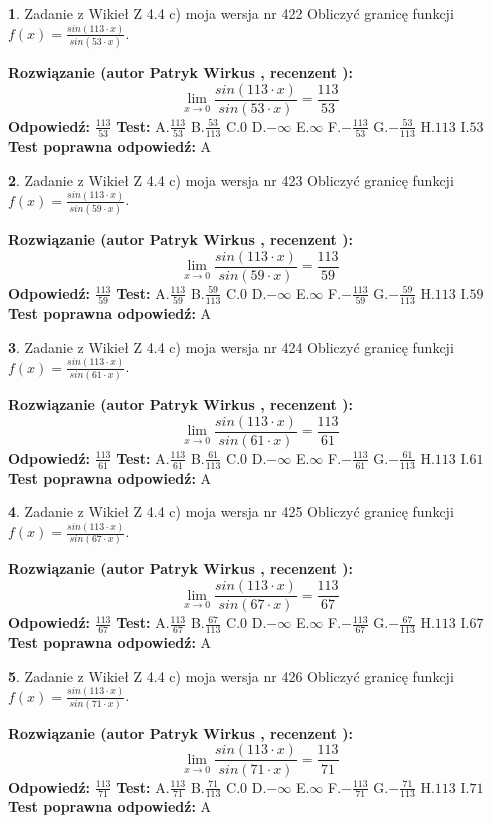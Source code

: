 \documentclass[12pt, a4paper]{article}
\theoremstyle{definition} %
\newtheorem{zad}{}
\newcommand{\zadStart}[1]{\begin{zad}#1\newline}
\newcommand{\zadStop}{\end{zad}}
\newcommand{\rozwStart}[2]{\noindent \textbf{Rozwiązanie (autor #1 , recenzent #2): }\newline}
\newcommand{\rozwStop}{\newline}
\newcommand{\odpStart}{\noindent \textbf{Odpowiedź:}\newline}
\newcommand{\odpStop}{\newline}
\newcommand{\testStart}{\noindent \textbf{Test:}\newline}
\newcommand{\testStop}{\newline}
\newcommand{\kluczStart}{\noindent \textbf{Test poprawna odpowiedź:}\newline}
\newcommand{\kluczStop}{\newline}
\begin{document}
\zadStart{Zadanie z Wikieł Z 4.4 c) moja wersja nr 422}
Obliczyć granicę funkcji $f(x)=\frac{sin(113\cdot x)}{sin(53\cdot x)}$.
\zadStop
\rozwStart{Patryk Wirkus}{}
$$\lim\limits_{x\to 0}\frac{sin(113\cdot x)}{sin(53\cdot x)}=
\frac{113}{53}$$
\rozwStop
\odpStart
$\frac{113}{53}$
\odpStop
\testStart
A.$\frac{113}{53}$
B.$\frac{53}{113}$
C.$0$
D.$-\infty$
E.$\infty$
F.$-\frac{113}{53}$
G.$-\frac{53}{113}$
H.$113$
I.$53$
\testStop
\kluczStart
A
\kluczStop



\zadStart{Zadanie z Wikieł Z 4.4 c) moja wersja nr 423}
Obliczyć granicę funkcji $f(x)=\frac{sin(113\cdot x)}{sin(59\cdot x)}$.
\zadStop
\rozwStart{Patryk Wirkus}{}
$$\lim\limits_{x\to 0}\frac{sin(113\cdot x)}{sin(59\cdot x)}=
\frac{113}{59}$$
\rozwStop
\odpStart
$\frac{113}{59}$
\odpStop
\testStart
A.$\frac{113}{59}$
B.$\frac{59}{113}$
C.$0$
D.$-\infty$
E.$\infty$
F.$-\frac{113}{59}$
G.$-\frac{59}{113}$
H.$113$
I.$59$
\testStop
\kluczStart
A
\kluczStop



\zadStart{Zadanie z Wikieł Z 4.4 c) moja wersja nr 424}
Obliczyć granicę funkcji $f(x)=\frac{sin(113\cdot x)}{sin(61\cdot x)}$.
\zadStop
\rozwStart{Patryk Wirkus}{}
$$\lim\limits_{x\to 0}\frac{sin(113\cdot x)}{sin(61\cdot x)}=
\frac{113}{61}$$
\rozwStop
\odpStart
$\frac{113}{61}$
\odpStop
\testStart
A.$\frac{113}{61}$
B.$\frac{61}{113}$
C.$0$
D.$-\infty$
E.$\infty$
F.$-\frac{113}{61}$
G.$-\frac{61}{113}$
H.$113$
I.$61$
\testStop
\kluczStart
A
\kluczStop



\zadStart{Zadanie z Wikieł Z 4.4 c) moja wersja nr 425}
Obliczyć granicę funkcji $f(x)=\frac{sin(113\cdot x)}{sin(67\cdot x)}$.
\zadStop
\rozwStart{Patryk Wirkus}{}
$$\lim\limits_{x\to 0}\frac{sin(113\cdot x)}{sin(67\cdot x)}=
\frac{113}{67}$$
\rozwStop
\odpStart
$\frac{113}{67}$
\odpStop
\testStart
A.$\frac{113}{67}$
B.$\frac{67}{113}$
C.$0$
D.$-\infty$
E.$\infty$
F.$-\frac{113}{67}$
G.$-\frac{67}{113}$
H.$113$
I.$67$
\testStop
\kluczStart
A
\kluczStop



\zadStart{Zadanie z Wikieł Z 4.4 c) moja wersja nr 426}
Obliczyć granicę funkcji $f(x)=\frac{sin(113\cdot x)}{sin(71\cdot x)}$.
\zadStop
\rozwStart{Patryk Wirkus}{}
$$\lim\limits_{x\to 0}\frac{sin(113\cdot x)}{sin(71\cdot x)}=
\frac{113}{71}$$
\rozwStop
\odpStart
$\frac{113}{71}$
\odpStop
\testStart
A.$\frac{113}{71}$
B.$\frac{71}{113}$
C.$0$
D.$-\infty$
E.$\infty$
F.$-\frac{113}{71}$
G.$-\frac{71}{113}$
H.$113$
I.$71$
\testStop
\kluczStart
A
\kluczStop
\end{document}
